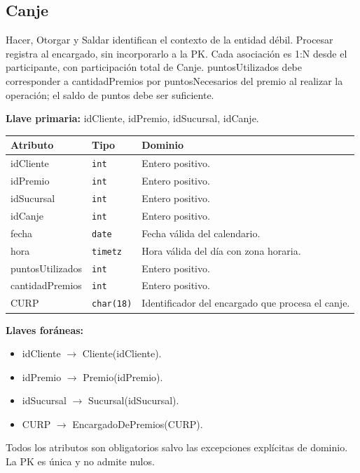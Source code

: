 \par\noindent\begin{minipage}{\textwidth}
\subsection{Canje}
Hacer, Otorgar y Saldar identifican el contexto de la entidad débil. Procesar registra al encargado, sin incorporarlo a la PK. Cada asociación es 1:N desde el participante, con participación total de Canje. puntosUtilizados debe corresponder a cantidadPremios por puntosNecesarios del premio al realizar la operación; el saldo de puntos debe ser suficiente.\par
\textbf{Llave primaria:} idCliente, idPremio, idSucursal, idCanje.\par
{\small\begin{tabular}{@{}p{}p{}p{}@{}}
\toprule Atributo & Tipo & Dominio \\ \midrule
idCliente & \texttt{int} & Entero positivo. \\
idPremio & \texttt{int} & Entero positivo. \\
idSucursal & \texttt{int} & Entero positivo. \\
idCanje & \texttt{int} & Entero positivo. \\
fecha & \texttt{date} & Fecha válida del calendario. \\
hora & \texttt{timetz} & Hora válida del día con zona horaria. \\
puntosUtilizados & \texttt{int} & Entero positivo. \\
cantidadPremios & \texttt{int} & Entero positivo. \\
CURP & \texttt{char(18)} & Identificador del encargado que procesa el canje. \\
\bottomrule\end{tabular}}
\textbf{Llaves foráneas:}\begin{itemize}[nosep]
\item idCliente $\rightarrow$ Cliente(idCliente).
\item idPremio $\rightarrow$ Premio(idPremio).
\item idSucursal $\rightarrow$ Sucursal(idSucursal).
\item CURP $\rightarrow$ EncargadoDePremios(CURP).
\end{itemize}
Todos los atributos son obligatorios salvo las excepciones explícitas de dominio. La PK es única y no admite nulos.
\end{minipage}\par\vspace{.35cm}
